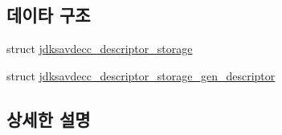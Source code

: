 \subsection*{데이타 구조}
\begin{DoxyCompactItemize}
\item 
struct \hyperlink{structjdksavdecc__descriptor__storage}{jdksavdecc\+\_\+descriptor\+\_\+storage}
\item 
struct \hyperlink{structjdksavdecc__descriptor__storage__gen__descriptor}{jdksavdecc\+\_\+descriptor\+\_\+storage\+\_\+gen\+\_\+descriptor}
\end{DoxyCompactItemize}


\subsection{상세한 설명}
